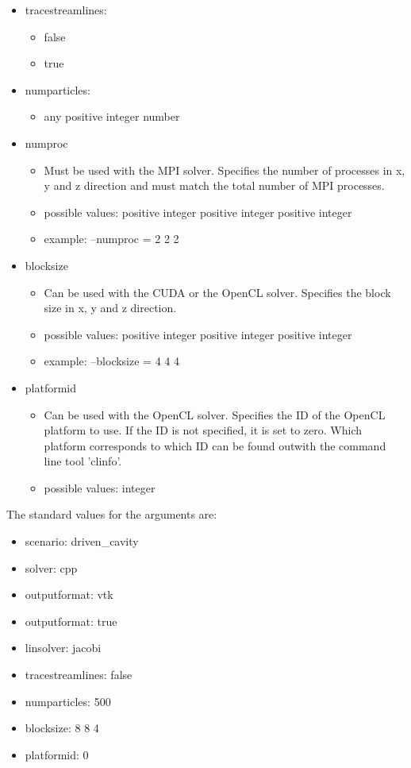 \documentclass{article}%
\begin{document}
\begin{itemize}
\begin{itemize}
	\end{itemize}
\item tracestreamlines:
	\begin{itemize}
	\item false
	\item true
	\end{itemize}
\item numparticles:
	\begin{itemize}
	\item any positive integer number
	\end{itemize}
\item numproc
	\begin{itemize}
	\item Must be used with the MPI solver. Specifies the number of processes in x, y and z direction and must match the total number of MPI processes.
	\item possible values: positive integer positive integer positive integer
	\item example: --numproc = 2 2 2
	\end{itemize}
\item blocksize
	\begin{itemize}
	\item Can be used with the CUDA or the OpenCL solver. Specifies the block size in x, y and z direction.
	\item possible values: positive integer positive integer positive integer
	\item example: --blocksize = 4 4 4
	\end{itemize}
\item platformid
	\begin{itemize}
	\item Can be used with the OpenCL solver. Specifies the ID of the OpenCL platform to use. If the ID is not specified, it is set to zero. Which platform corresponds to which ID can be found outwith the command line tool 'clinfo'.
	\item possible values: integer
	\end{itemize}
\end{itemize}

\noindent The standard values for the arguments are:
\begin{itemize}
\item scenario: driven\_cavity
\item solver: cpp
\item outputformat: vtk
\item outputformat: true
\item linsolver: jacobi
\item tracestreamlines: false
\item numparticles: 500
\item blocksize: 8 8 4
\item platformid: 0
\end{itemize}
\end{document}
